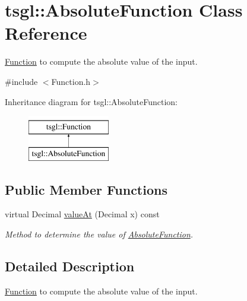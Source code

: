 \hypertarget{classtsgl_1_1_absolute_function}{\section{tsgl\-:\-:\-Absolute\-Function \-Class \-Reference}
\label{classtsgl_1_1_absolute_function}
}


\hyperlink{classtsgl_1_1_function}{\-Function} to compute the absolute value of the input.  




{\ttfamily \#include $<$\-Function.\-h$>$}

\-Inheritance diagram for tsgl\-:\-:\-Absolute\-Function\-:\begin{figure}[H]
\begin{center}
\leavevmode
\includegraphics[height=2.000000cm]{classtsgl_1_1_absolute_function}
\end{center}
\end{figure}
\subsection*{\-Public \-Member \-Functions}
\begin{DoxyCompactItemize}
\item 
virtual \-Decimal \hyperlink{classtsgl_1_1_absolute_function_a29b4dd051d17e92b4f2d64b492a6ca19}{value\-At} (\-Decimal x) const 
\begin{DoxyCompactList}\small\item\em \-Method to determine the value of \hyperlink{classtsgl_1_1_absolute_function}{\-Absolute\-Function}. \end{DoxyCompactList}\end{DoxyCompactItemize}


\subsection{\-Detailed \-Description}
\hyperlink{classtsgl_1_1_function}{\-Function} to compute the absolute value of the input. 

